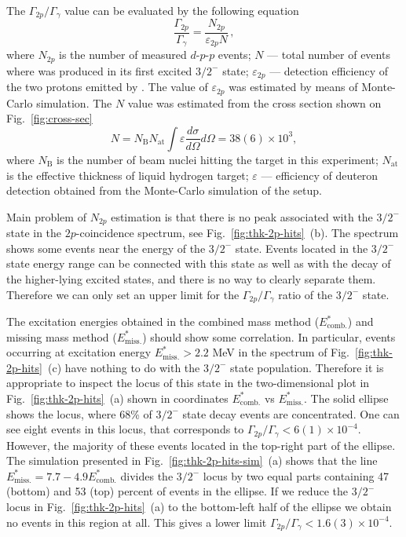 \documentclass[superscriptaddress,showpacs,showkeys,twoside,floatfix,twocolumn]
{revtex4-1}
\begin{document}
The \(\Gamma_{2p}/\Gamma_\gamma\) value can be evaluated by the following equation
%
\begin{equation}
  \frac{\Gamma_{2p}}{\Gamma_\gamma}= \dfrac{N_{2p}}{\varepsilon_{2p} N} \,,
  \label{eq:g-ratio}
\end{equation}
%
where \(N_{2p}\) is the number of measured $d$-$p$-$p$ events;
\(N\) --- total number of events where  was produced
in its first excited \(3/2^-\) state;
\(\varepsilon_{2p}\) --- detection efficiency of the two protons
emitted by .
The value of \(\varepsilon_{2p}\) was estimated by means of Monte-Carlo simulation.
The \(N\) value was estimated from the cross section shown on Fig.~\ref{fig:cross-sec}
\[
  N=N_\mathrm{B}N_\mathrm{at}
  \int\varepsilon \dfrac{d\sigma}{d\Omega} d\Omega =38(6)\times 10^3,
\]
where \(N_\mathrm{B}\) is the number of 
beam nuclei hitting the target in this experiment;
\(N_\mathrm{at}\)
is the effective thickness of liquid hydrogen target;
\(\varepsilon\) --- efficiency of deuteron detection
obtained from the Monte-Carlo simulation of the setup.

Main problem of \(N_{2p}\) estimation is that there is no peak associated with
the \(3/2^-\) state in the \(2p\)-coincidence spectrum, see Fig.~\ref{fig:thk-2p-hits}~(b).
The spectrum shows some events near the energy of the \(3/2^-\) state.
Events located in the \(3/2^-\) state energy range can be connected
with this state as well as with the decay of the higher-lying excited states, and
there is no way to clearly separate them.
Therefore we can only set an upper limit for the \(\Gamma_{2p}/\Gamma_\gamma\) ratio of the \(3/2^-\) state.

The excitation energies obtained in the combined mass method (\(E^*_\mathrm{comb.}\)) and
missing mass method (\(E^*_\mathrm{miss.}\)) should show some correlation.
In particular, events occurring at excitation energy $E^*_\mathrm{miss.}>2.2$ MeV
in the spectrum of Fig.~\ref{fig:thk-2p-hits}~(c) have nothing to do with
the $3/2^-$ state population.
Therefore it is appropriate to inspect the locus of this state in
the two-dimensional plot in Fig.~\ref{fig:thk-2p-hits}~(a)
shown in coordinates \(E^*_\mathrm{comb.}\) vs \(E^*_\mathrm{miss.}\).
The solid ellipse shows the locus, where 68\% of \(3/2^-\) state decay events are concentrated.
One can see eight events in this locus, that corresponds to
\(\Gamma_{2p}/\Gamma_\gamma<6(1)\times 10^{-4}\).
However, the majority of these events located in
the top-right part of the ellipse.
The simulation presented in Fig.~\ref{fig:thk-2p-hits-sim}~(a) shows
that the line $E^*_\mathrm{miss.}= 7.7 - 4.9 E^*_\mathrm{comb.}$
divides the $3/2^-$ locus by two equal parts containing 47 (bottom) and 53 (top)
percent of events in the ellipse.
If we reduce the \(3/2^-\) locus in Fig.~\ref{fig:thk-2p-hits}~(a) to
the bottom-left half of the ellipse we obtain no events in this region at all.
This gives a lower limit \(\Gamma_{2p}/\Gamma_\gamma<1.6(3)\times 10^{-4}\).
\end{document}
